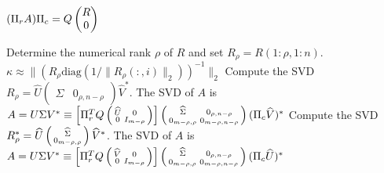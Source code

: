 \documentclass[12pt, a4paper, final]{article}
\numberwithin{equation}{section}
\begin{document}
\begin{algorithm}[hbt]
	\caption{$(U, \Sigma, V) = \mbox{\texttt{xGESVDQ}}(A,\mbox{method})$ ($A\in\mathbb{C}^{m\times n}$, $m\geq n$)}
	\label{zd:ALG:eig:xgesvdq}
	\begin{algorithmic}[1]
		\STATE $(\Pi_r A) \Pi_c = Q \begin{pmatrix} R \cr 0 \end{pmatrix}$ 
		
		\STATE Determine the numerical rank $\rho$ of $R$ and set $R_\rho = R(1:\rho,1:n)$. 
		\STATE $\kappa\approx \|(R_\rho\mathrm{diag}(1/\|R_\rho(:,i)\|_2))^{-1}\|_2$  
		\ENDIF
		\STATE Compute the SVD $R_\rho = \widehat{U}\begin{pmatrix} \widehat{\Sigma}& 0_{\rho,n-\rho}\end{pmatrix}\widehat{V}^*$. 
		\STATE The SVD of $A$ is $A = U\Sigma V^* \equiv \left[\Pi_r^T Q \left(\begin{smallmatrix} \widehat{U} & 0 \cr 0 & I_{m-\rho}\end{smallmatrix}\right)\right] \left(\begin{smallmatrix} \widehat{\Sigma} & 0_{\rho,n-\rho} \cr 0_{m-\rho,\rho} & 0_{m-\rho,n-\rho}\end{smallmatrix}\right) (\Pi_c\widehat{V})^*$
		\ELSE
		\STATE Compute the SVD $R_\rho^* = \widehat{U}\left(\begin{smallmatrix}\widehat{\Sigma}\cr 0_{m-\rho,\rho}\end{smallmatrix}\right)\widehat{V}^*$. 
		\STATE The SVD of $A$ is $A = U\Sigma V^* \equiv \left[\Pi_r^T Q \left(\begin{smallmatrix} \widehat{V} & 0 \cr 0 & I_{m-\rho}\end{smallmatrix}\right)\right] \left(\begin{smallmatrix} \widehat{\Sigma} & 0_{\rho,n-\rho} \cr 0_{m-\rho,\rho} & 0_{m-\rho,n-\rho}\end{smallmatrix}\right) (\Pi_c\widehat{U})^*$
		\ENDIF 
	\end{algorithmic}
\end{algorithm}
\end{document}
